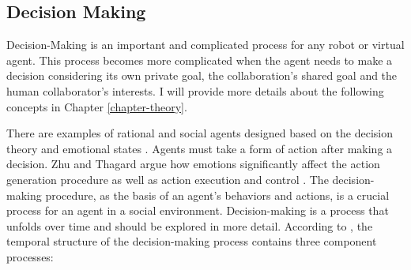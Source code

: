 \documentclass[11pt]{article}
\begin{document}
\subsection{Decision Making}

Decision-Making is an important and complicated process for any robot or virtual
agent. This process becomes more complicated when the agent needs to make a
decision considering its own private goal, the collaboration's shared goal and
the human collaborator's interests. I will provide more details about the
following concepts in Chapter \ref{chapter-theory}.

There are examples of rational and social agents designed based on the decision
theory and emotional states \cite{gmytrasiewicz:emotion-agent-decision}. Agents
must take a form of action after making a decision. Zhu and Thagard argue how
emotions significantly affect the action generation procedure as well as action
execution and control \cite{zhu:emotion-action}. The decision-making procedure,
as the basis of an agent's behaviors and actions, is a crucial process for an
agent in a social environment. Decision-making is a process that unfolds over
time and should be explored in more detail. According to
\cite{paulus:emotion-decision-belief}, the temporal structure of the
decision-making process contains three component processes:
\end{document}
